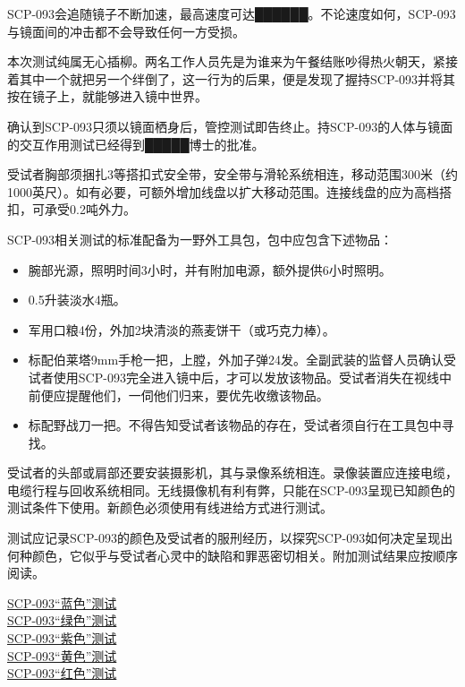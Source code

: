 SCP-093会追随镜子不断加速，最高速度可达██████。不论速度如何，SCP-093与镜面间的冲击都不会导致任何一方受损。

本次测试纯属无心插柳。两名工作人员先是为谁来为午餐结账吵得热火朝天，紧接着其中一个就把另一个绊倒了，这一行为的后果，便是发现了握持SCP-093并将其按在镜子上，就能够进入镜中世界。

确认到SCP-093只须以镜面栖身后，管控测试即告终止。持SCP-093的人体与镜面的交互作用测试已经得到█████博士的批准。

\begin{scpdialog}
\end{scpdialog}

受试者胸部须捆扎3等搭扣式安全带，安全带与滑轮系统相连，移动范围300米（约1000英尺）。如有必要，可额外增加线盘以扩大移动范围。连接线盘的应为高档搭扣，可承受0.2吨外力。

SCP-093相关测试的标准配备为一野外工具包，包中应包含下述物品：

\begin{itemize}
\item 腕部光源，照明时间3小时，并有附加电源，额外提供6小时照明。
\item 0.5升装淡水4瓶。
\item 军用口粮4份，外加2块清淡的燕麦饼干（或巧克力棒）。
\item 标配伯莱塔9mm手枪一把，上膛，外加子弹24发。全副武装的监督人员确认受试者使用SCP-093完全进入镜中后，才可以发放该物品。受试者消失在视线中前便应提醒他们，一伺他们归来，要优先收缴该物品。
\item 标配野战刀一把。不得告知受试者该物品的存在，受试者须自行在工具包中寻找。
\end{itemize}

受试者的头部或肩部还要安装摄影机，其与录像系统相连。录像装置应连接电缆，电缆行程与回收系统相同。无线摄像机有利有弊，只能在SCP-093呈现已知颜色的测试条件下使用。新颜色必须使用有线进给方式进行测试。

测试应记录SCP-093的颜色及受试者的服刑经历，以探究SCP-093如何决定呈现出何种颜色，它似乎与受试者心灵中的缺陷和罪恶密切相关。附加测试结果应按顺序阅读。

\hyperref[sec:DOC-scp-093-blue-test]{SCP-093“蓝色”测试}\\
\hyperref[sec:DOC-scp-093-green-test]{SCP-093“绿色”测试}\\
\hyperref[sec:DOC-scp-093-violet-test]{SCP-093“紫色”测试}\\
\hyperref[sec:DOC-scp-093-yellow-test]{SCP-093“黄色”测试}\\
\hyperref[sec:DOC-scp-093-red-test]{SCP-093“红色”测试}

